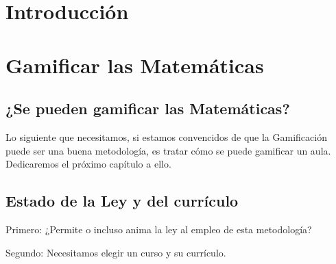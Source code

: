 \documentclass[a4paper, 12pt]{book}
\begin{document}





\cleardoublepage
\pagestyle{fancy}
\chapter{Introducción}






\cleardoublepage
\chapter{Gamificar las Matemáticas}

\section{¿Se pueden gamificar las Matemáticas?}

Lo siguiente que necesitamos, si estamos convencidos de que la Gamificación puede ser una buena metodología, es tratar cómo se puede gamificar un aula.
%
Dedicaremos el próximo capítulo a ello.

\section{Estado de la Ley y del currículo}

Primero: ¿Permite o incluso anima la ley al empleo de esta metodología?

Segundo: Necesitamos elegir un curso y su currículo.
\end{document}
